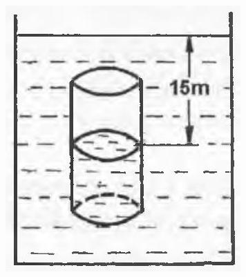 \documentclass[10pt]{article}
\begin{document}
\includegraphics[max width=\textwidth, center]{2025_07_01_5b3ff9fa0d508c8e9f17g-133}
\end{document}
